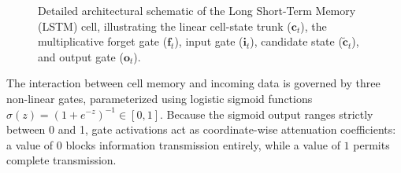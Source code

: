 \documentclass[../../../main.tex]{subfiles}
\begin{document}
\begin{figure}[htbp]
\caption{Detailed architectural schematic of the Long Short-Term Memory (LSTM) cell, illustrating the linear cell-state trunk ($\mathbf{c}_t$), the multiplicative forget gate ($\mathbf{f}_t$), input gate ($\mathbf{i}_t$), candidate state ($\tilde{\mathbf{c}}_t$), and output gate ($\mathbf{o}_t$).}
\label{fig:rnn_lstm_cell}
\end{figure}

The interaction between cell memory and incoming data is governed by three non-linear gates, parameterized using logistic sigmoid functions $\sigma(z) = (1 + e^{-z})^{-1} \in [0, 1]$. Because the sigmoid output ranges strictly between 0 and 1, gate activations act as coordinate-wise attenuation coefficients: a value of $0$ blocks information transmission entirely, while a value of $1$ permits complete transmission.
\end{document}
